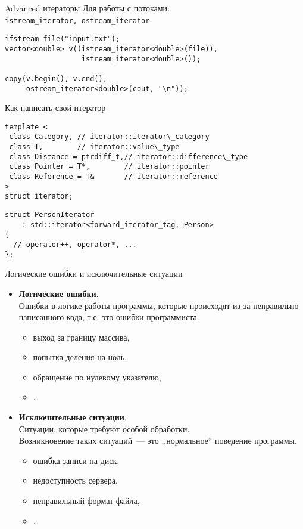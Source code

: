 \documentclass{beamer}
\begin{document}
\begin{frame}[fragile]{Advanced итераторы}
Для работы с потоками: \\{\tt istream\_iterator, ostream\_iterator}.
\begin{lstlisting}
ifstream file("input.txt");
vector<double> v((istream_iterator<double>(file)), 
                  istream_iterator<double>());
    
copy(v.begin(), v.end(), 
     ostream_iterator<double>(cout, "\n"));
\end{lstlisting}
\end{frame}

\begin{frame}[fragile]{Как написать свой итератор}
\begin{lstlisting}
template <
 class Category, // iterator::iterator\_category
 class T,        // iterator::value\_type
 class Distance = ptrdiff_t,// iterator::difference\_type
 class Pointer = T*,        // iterator::pointer
 class Reference = T&       // iterator::reference
>
struct iterator;
\end{lstlisting}

\begin{lstlisting}
struct PersonIterator 
    : std::iterator<forward_iterator_tag, Person>
{
  // operator++, operator*, ... 
};
\end{lstlisting}
\end{frame}

\begin{frame}[fragile]{Логические ошибки и исключительные ситуации}
\begin{itemize}
\item \textbf{Логические ошибки}.\\
Ошибки в логике работы программы, которые происходят 
из-за неправильно написанного кода, т.е. это ошибки программиста:
\begin{itemize} 
    \item выход за границу массива,
    \item попытка деления на ноль,
    \item обращение по нулевому указателю,
    \item \ldots
\end{itemize}
\item \textbf{Исключительные ситуации}.\\
Ситуации, которые требуют особой обработки.\\
Возникновение таких ситуаций~— это ,,нормальное``  поведение программы.
\begin{itemize} 
    \item ошибка записи на диск,
    \item недоступность сервера,
    \item неправильный формат файла,
    \item \ldots
\end{itemize}
\end{itemize}
\end{frame}
\end{document}
